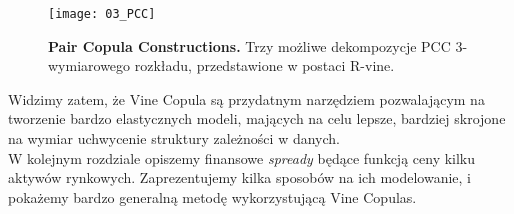 \begin{figure}[h]
	\centering
	\texttt{[image: 03\_PCC]}
	
	\caption{\textbf{Pair Copula Constructions.} Trzy możliwe dekompozycje PCC 3-wymiarowego rozkładu, przedstawione w postaci R-vine. \label{fig:PCCs}}
\end{figure}

Widzimy zatem, że Vine Copula są przydatnym narzędziem pozwalającym na tworzenie bardzo elastycznych modeli, mających na celu lepsze, bardziej skrojone na wymiar uchwycenie struktury zależności w danych.\\
W kolejnym rozdziale opiszemy finansowe \emph{spready} będące funkcją ceny kilku aktywów rynkowych. Zaprezentujemy kilka sposobów na ich modelowanie, i pokażemy bardzo generalną metodę wykorzystującą Vine Copulas.